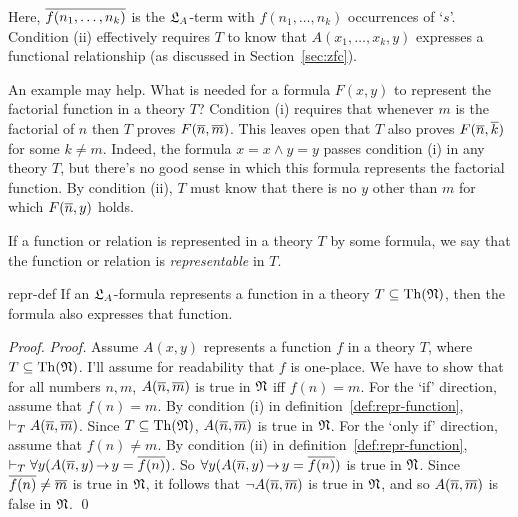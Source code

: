 
\noindent%
Here, $\overline{f(n_1,\ldots,n_k)}$ is the $\mathfrak{L}_A$-term with $f(n_1,\ldots,n_k)$ occurrences of `$s$'.
Condition (ii) effectively requires $T$ to know that $A(x_{1},\ldots,x_{k},y)$
expresses a functional relationship
(as discussed in Section~\ref{sec:zfc}).

An example may help.
What is needed for a formula $F(x,y)$ to represent the factorial function in a theory $T$?
Condition (i) requires that
whenever $m$ is the factorial of $n$
then $T$ proves $F(\overline{n},\overline{m})$.
This leaves open that
$T$ also proves $F(\overline{n},\overline{k})$ for some $k \not= m$.
Indeed,
the formula $x\!=\!x \land y\!=\!y$ passes condition (i)
in any theory $T$,
but there's no good sense in which this formula represents the factorial function.
By condition (ii),
$T$ must know that there is no $y$ other than $m$ for which $F(\overline{n},y)$ holds.

If a function or relation is represented in a theory $T$ by some formula,
we say that the function or relation is \emph{representable} in $T$.

\begin{proposition}{}{repr-def}
  If an $\mathfrak{L}_{A}$-formula represents a function in a theory $T \subseteq \mathrm{Th}(\mathfrak{N})$,
  then the formula also expresses that function.
\end{proposition}

\begin{proof}   
  \emph{Proof.}
  Assume $A(x,y)$ represents a function $f$ in a theory $T$,
  where $T \subseteq \mathrm{Th}(\mathfrak{N})$.
  I'll assume for readability that $f$ is one-place.
  We have to show that for all numbers $n,m$,
  $A(\overline{n},\overline{m})$ is true in $\mathfrak{N}$ iff $f(n) = m$.
  For the `if' direction,
  assume that $f(n) = m$.
  By condition (i) in definition~\ref{def:repr-function},
  $\vdash_{T} A(\overline{n},\overline{m})$.
  Since $T \subseteq \mathrm{Th}(\mathfrak{N})$,
  $A(\overline{n},\overline{m})$ is true in $\mathfrak{N}$.
  For the `only if' direction,
  assume that $f(n) \not= m$.
  By condition (ii) in definition~\ref{def:repr-function},
  $\proves_{T} \forall y(A(\num{n},y) \to y = \num{f(n)})$.
  So $\forall y(A(\num{n},y) \to y = \num{f(n)})$ is true in $\mathfrak{N}$.
  Since $\overline{f(n)} \not= \overline{m}$ is true in $\mathfrak{N}$,
  it follows that $\neg A(\overline{n},\overline{m})$ is true in $\mathfrak{N}$,
  and so $A(\overline{n},\overline{m})$ is false in $\mathfrak{N}$.
  \qed
\end{proof}

